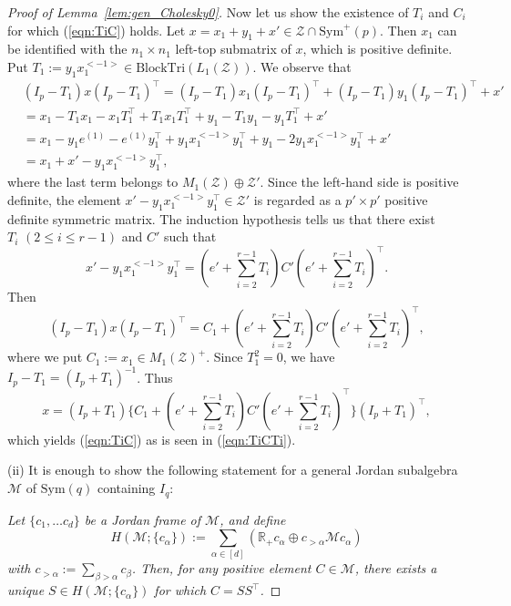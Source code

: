 \documentclass[12pt]{amsart}
\theoremstyle{plain}
\theoremstyle{definition}
\theoremstyle{remark}
\newcommand{\R}{\mathbb{R}}
\newcommand{\1}{\mathbf{1}}
\newcommand{\mytransp}[1]{ #1^{\top}}
\newcommand{\tri}{\mathrm{BlockTri}}
\begin{document}
\begin{proof}[Proof of Lemma~\ref{lem:gen_Cholesky0}]
 
Now let us show the existence of $T_i$ and $C_i$ for which (\ref{eqn:TiC}) holds.
Let $x = x_1 + y_1 + x' \in \mathcal{Z} \cap \mathrm{Sym}^+(p)$.
Then $x_1$ can be identified with the $n_1 \times n_1$ left-top submatrix of $x$, which is positive definite.
Put $T_1 := y_1 x_1^{<-1>} \in \tri(L_1(\mathcal{Z}))$.
We observe that
\begin{align*}
{} & (I_p - T_1) x \mytransp{(I_p - T_1)} 
 = (I_p - T_1) x_1 \mytransp{(I_p - T_1)} + (I_p - T_1)y_1\mytransp{(I_p - T_1)} + x'\\
 &= x_1  - T_1 x_1 - x_1 \mytransp{T_1} + T_1 x_1 \mytransp{T_1} + y_1 - T_1 y_1 - y_1 \mytransp{T_1} + x' \\
 &= x_1 - y_1 e^{(1)} - e^{(1)} \mytransp{y_1} + y_1 x_1^{<-1>} \mytransp{y_1} + y_1 - 2 y_1 x_1^{<-1>} \mytransp{y_1} + x' \\
 &= x_1 + x' - y_1 x_1^{<-1>} \mytransp{y_1},   
\end{align*}
 where the last term belongs to $M_1(\mathcal{Z}) \oplus \mathcal{Z}'$.
Since the left-hand side is positive definite, 
 the element $x' - y_1 x_1^{<-1>} \mytransp{y_1} \in \mathcal{Z'}$
 is regarded as a $p' \times p'$ positive definite symmetric matrix.
The induction hypothesis tells us that there exist $T_i\,\,(2\le i \le r-1)$ and $C'$ such that
$$
x' - y_1 x_1^{<-1>} \mytransp{y_1} 
= (e' + \sum_{i=2}^{r-1} T_i) C' \mytransp{ (e' + \sum_{i=2}^{r-1} T_i)}.
$$
Then
$$ (I_p - T_1) x \mytransp{(I_p - T_1)} 
= C_1 +(e' + \sum_{i=2}^{r-1} T_i) C' \mytransp{ (e' + \sum_{i=2}^{r-1} T_i) },$$
 where we put $C_1 := x_1 \in M_1(\mathcal{Z})^+$.
Since $T_1^2 = 0$, 
we have $I_p - T_1 = (I_p + T_1)^{-1}$.
Thus
$$
x = (I_p + T_1)\{ C_1+ (e' + \sum_{i=2}^{r-1} T_i) C' \mytransp{ (e' + \sum_{i=2}^{r-1} T_i)} \} \mytransp{(I_p + T_1)}, 
$$
 which yields (\ref{eqn:TiC}) as is seen in (\ref{eqn:TiCTi}). 


\noindent
(ii) It is enough to show the following statement
 for a general Jordan subalgebra $\mathcal{M}$ of $\mathrm{Sym}(q)$ containing $I_q$:
 
\textit{
Let $\{c_1, \dots c_d\}$ be a Jordan frame of $\mathcal{M}$,
 and define
 $$
 H(\mathcal{M}; \{c_\alpha\})
 := \sum_{\alpha \in [d]} (\R_+ c_{\alpha} \oplus c_{>\alpha}\mathcal{M} c_\alpha )
 $$
 with
 $c_{>\alpha} := \sum_{\beta > \alpha} c_\beta$. 
Then, 
 for any positive element $C \in \mathcal{M}$, 
 there exists a unique
 $S \in H(\mathcal{M}; \{c_\alpha\})$
 for which $C = S \mytransp{S}$.}




\end{proof}
\end{document}
